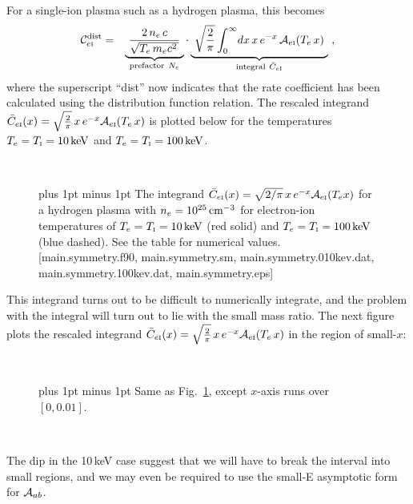 \documentclass[preprint,12pt,eqsecnum,nofootinbib,amsmath,amssymb]{revtex4}
\newcommand{\smI}{{\rm\scriptscriptstyle I}}
\newcommand{\footnoteskip}{\baselineskip 12pt plus 1pt minus 1pt}
\begin{document}
\vskip0.3cm
\noindent
For a single-ion plasma such as a hydrogen plasma, this becomes
\begin{eqnarray}
  {\cal C}_{e\smI}^\text{dist} 
  &=& 
  \underbrace{~
  \frac{2\, n_e\,c}{\sqrt{T_e\,m_e c^2\,}}
  ~}_{\text{prefactor}~N_e} 
  \cdot
  \underbrace{~
  \sqrt{\frac{2}{\pi}}
  \int_0^\infty \! 
  d x\, x\,    e^{-x}\, {\cal A}_{e\smI}(T_e\,x)
  ~}_{\text{integral}~ {\bar C_{e\smI}}   } \ ,
\end{eqnarray}
where the superscript ``dist'' now indicates that the rate coefficient
has been calculated using the distribution function relation. The
rescaled integrand $\bar C_{e\smI}(x) = \sqrt{\frac{2}{\pi}}\, x
\,e^{-x} {\cal A}_{e\smI}(T_e\,x)$ is plotted below for the
temperatures $T_e=T_\smI=10\,{\rm keV}$ and $T_e=T_\smI=100\,{\rm
keV}$.


\pagebreak

~

\begin{figure}[h!]
\vskip-0.3cm 
\caption{\footnoteskip  
  The integrand $\bar C_{e\smI}(x)=\sqrt{2/\pi}\, x\, e^{-x} {\cal
  A}_{e\smI}(T_e x) $ for a hydrogen plasma with $n_e= 10^{25}\,{\rm
  cm}^{-3}$ for electron-ion temperatures of $T_e=T_\smI=10\,{\rm
  keV}$ (red solid) and $T_e=T_\smI=100\,{\rm keV}$ (blue dashed).
  See the table for numerical values. [main.symmetry.f90,
  main.symmetry.sm, main.symmetry.010kev.dat,
  main.symmetry.100kev.dat, main.symmetry.eps]
}
\label{fig:main.symmetry.eps}
\end{figure}
\noindent
This integrand turns out to be difficult to numerically integrate, and
the problem with the integral will turn out to lie with the small mass
ratio. The next figure plots the rescaled integrand $\bar C_{e\smI}(x)
= \sqrt{\frac{2}{\pi}}\, x \,e^{-x} {\cal A}_{e\smI}(T_e\,x)$ in the
region of small-$x$:

~

\begin{figure}[h!]
\vskip-0.3cm 
\caption{\footnoteskip  
  Same as Fig.~\ref{fig:main.symmetry.eps}, except $x$-axis runs over
  $[0,0.01]$. 
}
\label{fig:main.symmetry.smallE.eps}
\end{figure}

~

\noindent
The dip in the 10\,keV case suggest that we will have to break
the interval into small regions, and we may even be required to
use the small-E asymptotic form for ${\cal A}_{ab}$. 
\end{document}
